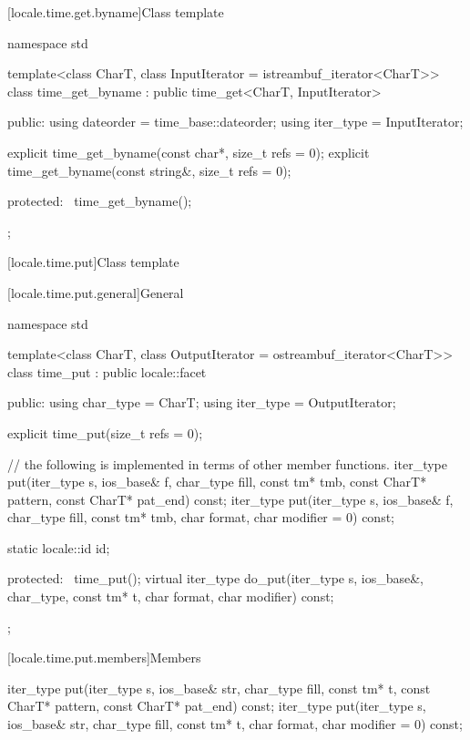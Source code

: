 [locale.time.get.byname]{Class template }

%
\begin{codeblock}
namespace std {
  template<class CharT, class InputIterator = istreambuf_iterator<CharT>>
    class time_get_byname : public time_get<CharT, InputIterator> {
    public:
      using dateorder = time_base::dateorder;
      using iter_type = InputIterator;

      explicit time_get_byname(const char*, size_t refs = 0);
      explicit time_get_byname(const string&, size_t refs = 0);

    protected:
      ~time_get_byname();
    };
}
\end{codeblock}

[locale.time.put]{Class template }

[locale.time.put.general]{General}

%
\begin{codeblock}
namespace std {
  template<class CharT, class OutputIterator = ostreambuf_iterator<CharT>>
    class time_put : public locale::facet {
    public:
      using char_type = CharT;
      using iter_type = OutputIterator;

      explicit time_put(size_t refs = 0);

      // the following is implemented in terms of other member functions.
      iter_type put(iter_type s, ios_base& f, char_type fill, const tm* tmb,
                    const CharT* pattern, const CharT* pat_end) const;
      iter_type put(iter_type s, ios_base& f, char_type fill,
                    const tm* tmb, char format, char modifier = 0) const;

      static locale::id id;

    protected:
      ~time_put();
      virtual iter_type do_put(iter_type s, ios_base&, char_type, const tm* t,
                               char format, char modifier) const;
    };
}
\end{codeblock}

[locale.time.put.members]{Members}

%
\begin{itemdecl}
iter_type put(iter_type s, ios_base& str, char_type fill, const tm* t,
              const CharT* pattern, const CharT* pat_end) const;
iter_type put(iter_type s, ios_base& str, char_type fill, const tm* t,
              char format, char modifier = 0) const;
\end{itemdecl}

